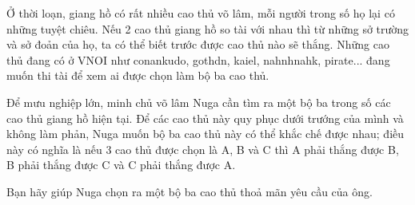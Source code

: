 Ở thời loạn, giang hồ có rất nhiều cao thủ võ lâm, mỗi người trong số họ lại có những tuyệt chiêu. Nếu 2 cao thủ giang hồ so tài với nhau thì từ những sở trường và sở đoản của họ, ta có thể biết trước được cao thủ nào sẽ thắng. Những cao thủ đang có ở VNOI như conankudo, gothdn, kaiel, nahnhnahk, pirate... đang muốn thi tài để xem ai được chọn làm bộ ba cao thủ.  

   Để mưu nghiệp lớn, minh chủ võ lâm Nuga cần tìm ra một bộ ba trong số các cao thủ giang hồ hiện tại. Để các cao thủ này quy phục dưới trướng của mình và không làm phản, Nuga muốn bộ ba cao thủ này có thể khắc chế được nhau; điều này có nghĩa là nếu 3 cao thủ được chọn là A, B và C thì A phải thắng được B, B phải thắng được C và C phải thắng được A.  

   Bạn hãy giúp Nuga chọn ra một bộ ba cao thủ thoả mãn yêu cầu của ông.